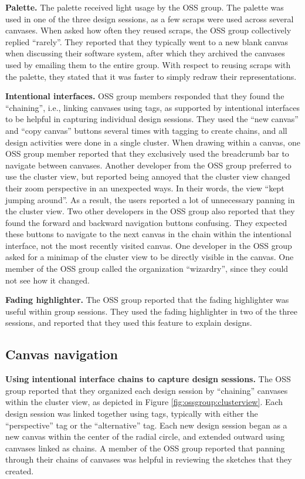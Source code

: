 \textbf{Palette.} The palette received light usage by the OSS group. The palette was used in one of the three design sessions, as a few scraps were used across several canvases. When asked how often they reused scraps, the OSS group collectively replied ``rarely''. They reported that they typically went to a new blank canvas when discussing their software system, after which they archived the canvases used by emailing them to the entire group. With respect to reusing scraps with the palette, they stated that it was faster to simply redraw their representations.

\textbf{Intentional interfaces.} OSS group members responded that they found the ``chaining'', i.e., linking canvases using tags, as supported by intentional interfaces to be helpful in capturing individual design sessions. They used the ``new canvas'' and ``copy canvas'' buttons several times with tagging to create chains, and all design activities were done in a single cluster. When drawing within a canvas, one OSS group member reported that they exclusively used the breadcrumb bar to navigate between canvases. Another developer from the OSS group preferred to use the cluster view, but reported being annoyed that the cluster view changed their zoom perspective in an unexpected ways. In their words, the view ``kept jumping around''. As a result, the users reported a lot of unnecessary panning in the cluster view. Two other developers in the OSS group also reported that they found the forward and backward navigation buttons confusing. They expected these buttons to navigate to the next canvas in the chain within the intentional interface, not the most recently visited canvas. One developer in the OSS group asked for a minimap of the cluster view to be directly visible in the canvas. One member of the OSS group called the organization ``wizardry'', since they could not see how it changed.

\textbf{Fading highlighter.} The OSS group reported that the fading highlighter was useful within group sessions. They used the fading highlighter in two of the three sessions, and reported that they used this feature to explain designs.

\subsection{Canvas navigation}

\textbf{Using intentional interface chains to capture design sessions.} The OSS group reported that they organized each design session by ``chaining'' canvases within the cluster view, as depicted in Figure \ref{fig:ossgroup:clusterview}. Each design session was linked together using tags, typically with either the ``perspective'' tag or the ``alternative'' tag. Each new design session began as a new canvas within the center of the radial circle, and extended outward using canvases linked as chains. A member of the OSS group reported that panning through their chains of canvases was helpful in reviewing the sketches that they created.

